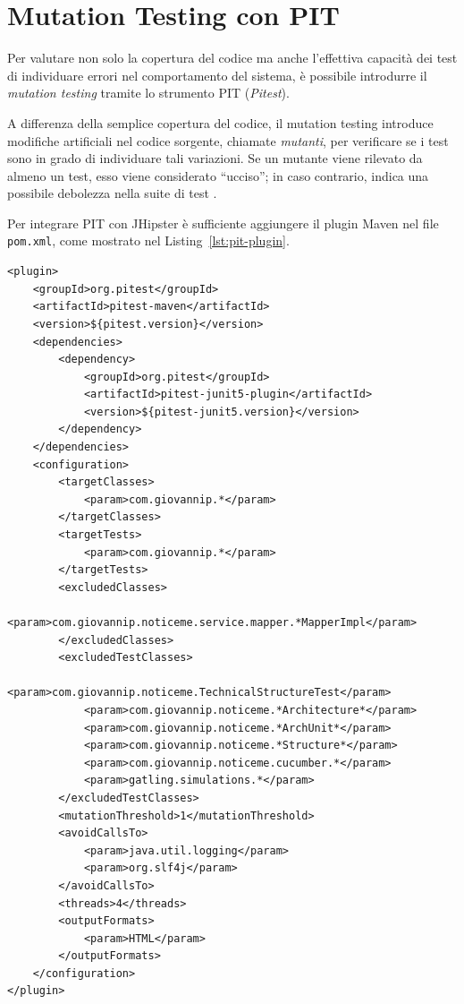 \section{Mutation Testing con PIT}
\label{sec:pit}

Per valutare non solo la copertura del codice ma anche l'effettiva capacità dei test di individuare errori nel comportamento del sistema, è possibile introdurre il \textit{mutation testing} tramite lo strumento PIT (\textit{Pitest}). 

A differenza della semplice copertura del codice, il mutation testing introduce modifiche artificiali nel codice sorgente, chiamate \textit{mutanti}, per verificare se i test sono in grado di individuare tali variazioni. Se un mutante viene rilevato da almeno un test, esso viene considerato ``ucciso''; in caso contrario, indica una possibile debolezza nella suite di test \cite{BettiniTDD,PITDocs}.

Per integrare PIT con JHipster è sufficiente aggiungere il plugin Maven nel file \texttt{pom.xml}, come mostrato nel Listing~\ref{lst:pit-plugin}.

\captionsetup{type=listing}
\label{lst:pit-plugin}
\begin{verbatim}
<plugin>
	<groupId>org.pitest</groupId>
	<artifactId>pitest-maven</artifactId>
	<version>${pitest.version}</version>
	<dependencies>
		<dependency>
			<groupId>org.pitest</groupId>
			<artifactId>pitest-junit5-plugin</artifactId>
			<version>${pitest-junit5.version}</version>
		</dependency>
	</dependencies>
	<configuration>
		<targetClasses>
			<param>com.giovannip.*</param>
		</targetClasses>
		<targetTests>
			<param>com.giovannip.*</param>
		</targetTests>
		<excludedClasses>
			<param>com.giovannip.noticeme.service.mapper.*MapperImpl</param>
		</excludedClasses>
		<excludedTestClasses>
			<param>com.giovannip.noticeme.TechnicalStructureTest</param>
			<param>com.giovannip.noticeme.*Architecture*</param>
			<param>com.giovannip.noticeme.*ArchUnit*</param>
			<param>com.giovannip.noticeme.*Structure*</param>
			<param>com.giovannip.noticeme.cucumber.*</param>
			<param>gatling.simulations.*</param>
		</excludedTestClasses>
		<mutationThreshold>1</mutationThreshold>
		<avoidCallsTo>
			<param>java.util.logging</param>
			<param>org.slf4j</param>
		</avoidCallsTo>
		<threads>4</threads>
		<outputFormats>
			<param>HTML</param>
		</outputFormats>
	</configuration>
</plugin>
\end{verbatim}

